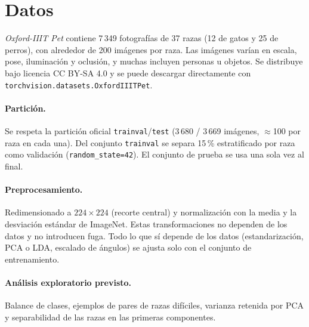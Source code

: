 \documentclass[11pt,letterpaper]{article}
\begin{document}
\section{Datos}
\emph{Oxford-IIIT Pet} \cite{parkhi2012} contiene 7\,349 fotografías de 37 razas (12 de gatos y 25 de
perros), con alrededor de 200 imágenes por raza. Las imágenes varían en escala, pose, iluminación y
oclusión, y muchas incluyen personas u objetos. Se distribuye bajo licencia CC BY-SA 4.0 y se puede
descargar directamente con \texttt{torchvision.datasets.OxfordIIITPet}.

\paragraph{Partición.} Se respeta la partición oficial \texttt{trainval}/\texttt{test}
(3\,680 / 3\,669 imágenes, $\approx$100 por raza en cada una). Del conjunto \texttt{trainval} se separa
15\,\% estratificado por raza como validación (\texttt{random\_state=42}). El conjunto de prueba se
usa una sola vez al final.

\paragraph{Preprocesamiento.} Redimensionado a $224\times224$ (recorte central) y normalización con
la media y la desviación estándar de ImageNet. Estas transformaciones no dependen de los datos y no
introducen fuga. Todo lo que sí depende de los datos (estandarización, PCA o LDA, escalado de ángulos)
se ajusta solo con el conjunto de entrenamiento.

\paragraph{Análisis exploratorio previsto.} Balance de clases, ejemplos de pares de razas difíciles,
varianza retenida por PCA y separabilidad de las razas en las primeras componentes.

\end{document}

